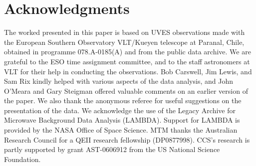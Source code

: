 \documentclass[useAMS,usenatbib]{mn2e}
\begin{document}
\section*{Acknowledgments}
The worked presented in this paper is based on
UVES observations made with the European Southern
Observatory VLT/Kueyen telescope at Paranal, Chile, obtained
in programme 078.A-0185(A) and from the public data archive.
We are grateful to the ESO
time assignment committee,
and to the staff astronomers at VLT
for their help in conducting the observations. 
Bob Carswell, Jim Lewis,
and Sam Rix kindly helped with various aspects of the data analysis,
and John O'Meara and Gary Steigman offered valuable 
comments on an earlier version of the paper.
We also thank the anonymous referee for useful suggestions
on the presentation of the data.
We acknowledge the use of the Legacy Archive for Microwave Background Data
Analysis (LAMBDA). Support for LAMBDA is provided by the NASA Office of
Space Science. MTM thanks the Australian Research Council for a QEII research
fellowship (DP0877998). CCS's research is partly supported by grant
AST-0606912 from the US National Science Foundation.
\end{document}
